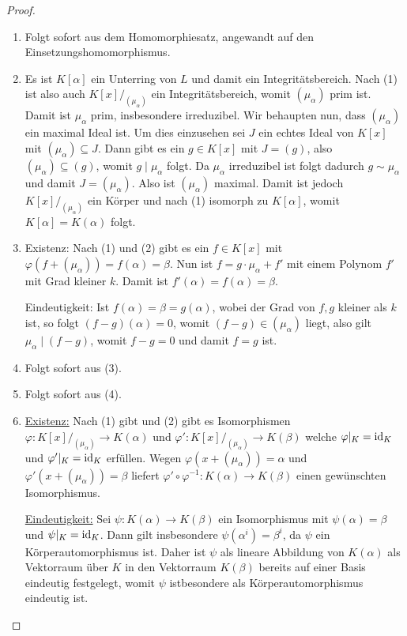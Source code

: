 \begin{proof}{\ }
    \begin{enumerate}
        \item Folgt sofort aus dem Homomorphiesatz, angewandt auf den Einsetzungshomomorphismus.
        
        \item Es ist $K[\alpha]$ ein Unterring von $L$ und damit ein Integritätsbereich. Nach (1) ist also auch $K[x]/_{(\mu_\alpha)}$ ein Integritätsbereich, womit $(\mu_\alpha)$ prim ist. Damit ist $\mu_\alpha$ prim, insbesondere irreduzibel. Wir behaupten nun, dass $(\mu_\alpha)$ ein maximal Ideal ist. Um dies einzusehen sei $J$ ein echtes Ideal von $K[x]$ mit $(\mu_\alpha) \subseteq J$. Dann gibt es ein $g \in K[x]$ mit $J = (g)$, also $(\mu_\alpha) \subseteq (g)$, womit $g \mid \mu_\alpha$ folgt. Da $\mu_\alpha$ irreduzibel ist folgt dadurch $g \sim \mu_\alpha$ und damit $J = (\mu_\alpha)$. Also ist $(\mu_\alpha)$ maximal. Damit ist jedoch $K[x]/_{(\mu_\alpha)}$ ein Körper und nach (1) isomorph zu $K[\alpha]$, womit $K[\alpha] = K(\alpha)$ folgt.
        
        \item Existenz: Nach (1) und (2) gibt es ein $f \in K[x]$ mit $\varphi(f + (\mu_\alpha)) = f(\alpha) = \beta$. Nun ist $f = g \cdot \mu_\alpha + f'$ mit einem Polynom $f'$ mit Grad kleiner $k$. Damit ist $f'(\alpha) = f(\alpha) = \beta$.
        
        Eindeutigkeit: Ist $f(\alpha) = \beta = g(\alpha)$, wobei der Grad von $f, g$ kleiner als $k$ ist, so folgt $(f-g)(\alpha) = 0$, womit $(f-g) \in (\mu_\alpha)$ liegt, also gilt $\mu_\alpha \mid (f-g)$, womit $f-g=0$ und damit $f=g$ ist.

        \item Folgt sofort aus (3).
        
        \item Folgt sofort aus (4).
        
        \item \underline{Existenz:} Nach (1) gibt und (2) gibt es Isomorphismen
        $\varphi:K[x]/_{(\mu_\alpha)}\to K(\alpha)$ und $\varphi':K[x]/_{(\mu_\alpha)}\to K(\beta)$
        welche $\varphi\vert_K=\operatorname{id}_K$ und $\varphi'\vert_K=\operatorname{id}_K$ erfüllen. Wegen $\varphi(x+(\mu_\alpha))=\alpha$
        und $\varphi'(x+(\mu_\alpha))=\beta$ liefert $\varphi'\circ\varphi^{-1}:K(\alpha)\to K(\beta)$
        einen gewünschten Isomorphismus.

        \underline{Eindeutigkeit:} Sei $\psi:K(\alpha)\to K(\beta)$ ein Isomorphismus mit $\psi(\alpha)=\beta$
        und $\psi\vert_K=\operatorname{id}_K$. Dann gilt insbesondere $\psi(\alpha^i)=\beta^i$, da $\psi$ ein Körperautomorphismus
        ist. Daher ist $\psi$ als lineare Abbildung von $K(\alpha)$ als Vektorraum über $K$ in den Vektorraum $K(\beta)$
        bereits auf einer Basis eindeutig festgelegt, womit $\psi$ istbesondere als Körperautomorphismus eindeutig ist.
    \end{enumerate}
\end{proof}

